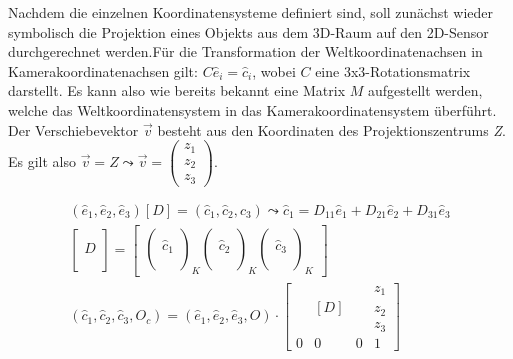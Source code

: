 Nachdem die einzelnen Koordinatensysteme definiert sind, soll zunächst wieder symbolisch die Projektion eines Objekts aus dem 3D-Raum auf den 2D-Sensor durchgerechnet werden.Für die Transformation der Weltkoordinatenachsen in Kamerakoordinatenachsen gilt: \ensuremath{C\hat{e}_i = \hat{c}_i}, wobei \ensuremath{C} eine 3x3-Rotationsmatrix darstellt. Es kann also wie bereits bekannt eine Matrix \ensuremath{M} aufgestellt werden, welche das Weltkoordinatensystem in das Kamerakoordinatensystem überführt. Der Verschiebevektor \ensuremath{\vec{v}} besteht aus den Koordinaten des Projektionszentrums \textit{Z}. Es gilt also \ensuremath{\vec{v} = Z \leadsto \vec{v} = \begin{pmatrix}
		z_1\\z_2\\z_3
\end{pmatrix}}.

\begin{gather} 		
(\hat{e}_1,\hat{e}_2,\hat{e}_3)[D] =(\hat{c}_1, \hat{c}_2, \hat{c}_3) \leadsto \hat{c}_1 = D_{11}\hat{e}_1 + D_{21} \hat{e}_2 + D_{31}\hat{e}_3\\	
\begin{bmatrix}
\\D\\\\
\end{bmatrix}
=	\begin{bmatrix}
\begin{pmatrix}
\\
\hat{c}_1\\
\\
\end{pmatrix}_K
\begin{pmatrix}
\\
\hat{c}_2\\
\\
\end{pmatrix}_K
\begin{pmatrix}
\\
\hat{c}_3\\
\\
\end{pmatrix}_K
\end{bmatrix}\\
(\hat{c}_1, \hat{c}_2, \hat{c}_3,O_c)=(\hat{e}_1,\hat{e}_2,\hat{e}_3,O) \cdot
\begin{bmatrix}
&  &  &z_1 \\
&  [D]&  &z_2 \\ 
&  &  &z_3 \\
0&0&0 & 1
\end{bmatrix}	
\end{gather}

